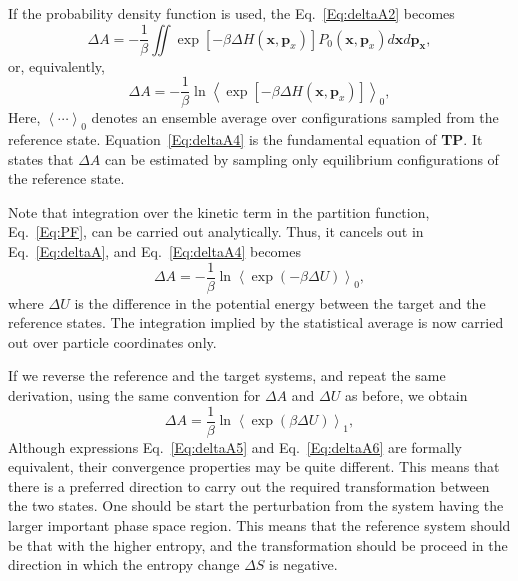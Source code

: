 If the probability density function is used, the Eq.~\ref{Eq:deltaA2}  becomes
\begin{equation}
\Delta A = -\frac{1}{\beta} \iint \exp[-\beta \Delta H(\textbf{x},\textbf{p}_{x})] P_{0}(\textbf{x},\textbf{p}_{x}) d\textbf{x}d\textbf{p}_\textbf{x},
\label{Eq:deltaA3}
\end{equation}
or, equivalently,
\begin{equation}
\Delta A = -\frac{1}{\beta} \ln{ \left \langle \exp[-\beta \Delta H(\textbf{x},\textbf{p}_{x})] \right \rangle_{0}},
\label{Eq:deltaA4}
\end{equation}
Here, $\left \langle \cdots \right \rangle _{0}$ denotes an ensemble average over configurations sampled from the reference state. Equation~\ref{Eq:deltaA4} is the fundamental equation of \textbf{TP}. It states that $\Delta A$ can be estimated by sampling only equilibrium configurations of the reference state.

Note that integration over the kinetic term in the partition function, Eq.~\ref{Eq:PF}, can be carried out analytically. Thus, it cancels out in Eq.~\ref{Eq:deltaA}, and Eq.~\ref{Eq:deltaA4} becomes
\begin{equation}
\Delta A = -\frac{1}{\beta} \ln{\left \langle \exp(-\beta \Delta U) \right \rangle_{0}},
\label{Eq:deltaA5}
\end{equation}
where $\Delta U$ is the difference in the potential energy between the target and the reference states. The integration implied by the statistical average is now carried out over particle coordinates only.

If we reverse the reference and the target systems, and repeat the same derivation, using the same convention for  $\Delta A$ and $\Delta U$ as before, we obtain
\begin{equation}
\Delta A = \frac{1}{\beta} \ln{ \left \langle \exp(\beta \Delta U) \right \rangle_{1}},
\label{Eq:deltaA6}
\end{equation}
Although expressions Eq.~\ref{Eq:deltaA5} and Eq.~\ref{Eq:deltaA6} are formally equivalent, their convergence properties may be quite different. This means that there is a preferred direction to carry out the required transformation between the two states. One should be start the perturbation from the system having the larger important phase space region. This means that the reference system should be that with the higher entropy, and the transformation should be proceed in the direction in which the entropy change $\Delta S$ is negative. 

